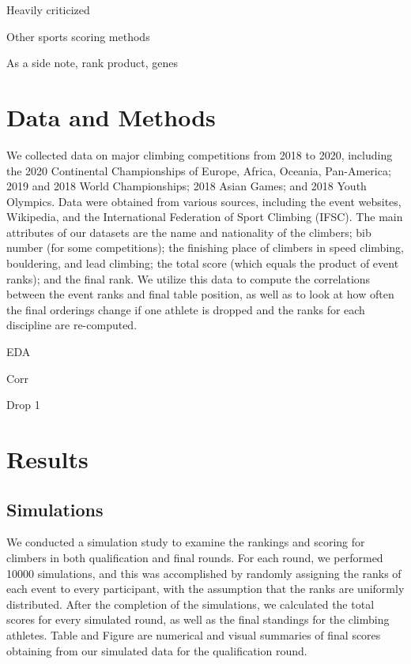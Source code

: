 \documentclass[12pt]{article}
\begin{document}
Heavily criticized

Other sports scoring methods

As a side note, rank product, genes

\hypertarget{data-and-methods}{%
\section{Data and Methods}\label{data-and-methods}}

We collected data on major climbing competitions from 2018 to 2020,
including the 2020 Continental Championships of Europe, Africa, Oceania,
Pan-America; 2019 and 2018 World Championships; 2018 Asian Games; and
2018 Youth Olympics. Data were obtained from various sources, including
the event websites, Wikipedia, and the International Federation of Sport
Climbing (IFSC). The main attributes of our datasets are the name and
nationality of the climbers; bib number (for some competitions); the
finishing place of climbers in speed climbing, bouldering, and lead
climbing; the total score (which equals the product of event ranks); and
the final rank. We utilize this data to compute the correlations between
the event ranks and final table position, as well as to look at how
often the final orderings change if one athlete is dropped and the ranks
for each discipline are re-computed.

EDA

Corr

Drop 1

\hypertarget{results}{%
\section{Results}\label{results}}

\hypertarget{simulations}{%
\subsection{Simulations}\label{simulations}}

We conducted a simulation study to examine the rankings and scoring for
climbers in both qualification and final rounds. For each round, we
performed 10000 simulations, and this was accomplished by randomly
assigning the ranks of each event to every participant, with the
assumption that the ranks are uniformly distributed. After the
completion of the simulations, we calculated the total scores for every
simulated round, as well as the final standings for the climbing
athletes. Table and Figure are numerical and visual summaries of final
scores obtaining from our simulated data for the qualification round.
\end{document}
